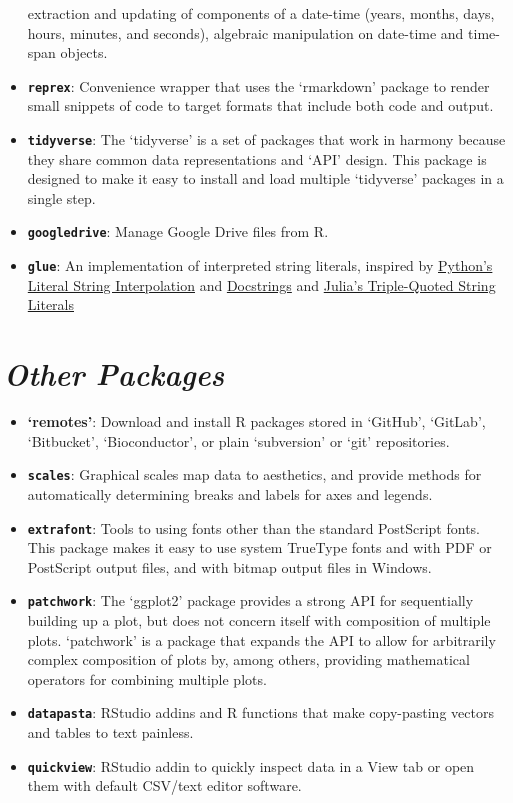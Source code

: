 \documentclass[
  letterpaper,
  DIV=11,
  numbers=noendperiod]{scrreprt}
\providecommand{\tightlist}{%
  \setlength{\itemsep}{0pt}\setlength{\parskip}{0pt}}\usepackage{longtable,booktabs,array}
\begin{document}
\begin{itemize}
  extraction and updating of components of a date-time (years, months,
  days, hours, minutes, and seconds), algebraic manipulation on
  date-time and time-span objects.
\item
  \textbf{\texttt{reprex}}: Convenience wrapper that uses the
  `rmarkdown' package to render small snippets of code to target formats
  that include both code and output.
\item
  \textbf{\texttt{tidyverse}}: The `tidyverse' is a set of packages that
  work in harmony because they share common data representations and
  `API' design. This package is designed to make it easy to install and
  load multiple `tidyverse' packages in a single step.
\item
  \textbf{\texttt{googledrive}}: Manage Google Drive files from R.
\item
  \textbf{\texttt{glue}}: An implementation of interpreted string
  literals, inspired by
  \href{https://www.python.org/dev/peps/pep-0498/}{Python's Literal
  String Interpolation} and
  \href{https://www.python.org/dev/peps/pep-0257/}{Docstrings} and
  \href{https://docs.julialang.org/en/v1.3/manual/strings/\#Triple-Quoted-String-Literals-1}{Julia's
  Triple-Quoted String Literals}
\end{itemize}

\hypertarget{other-packages}{%
\section{\texorpdfstring{\emph{Other
Packages}}{Other Packages}}\label{other-packages}}

\begin{itemize}
\tightlist
\item
  \textbf{`remotes'}: Download and install R packages stored in
  `GitHub', `GitLab', `Bitbucket', `Bioconductor', or plain `subversion'
  or `git' repositories.
\item
  \textbf{\texttt{scales}}: Graphical scales map data to aesthetics, and
  provide methods for automatically determining breaks and labels for
  axes and legends.
\item
  \textbf{\texttt{extrafont}}: Tools to using fonts other than the
  standard PostScript fonts. This package makes it easy to use system
  TrueType fonts and with PDF or PostScript output files, and with
  bitmap output files in Windows.
\item
  \textbf{\texttt{patchwork}}: The `ggplot2' package provides a strong
  API for sequentially building up a plot, but does not concern itself
  with composition of multiple plots. `patchwork' is a package that
  expands the API to allow for arbitrarily complex composition of plots
  by, among others, providing mathematical operators for combining
  multiple plots.
\item
  \textbf{\texttt{datapasta}}: RStudio addins and R functions that make
  copy-pasting vectors and tables to text painless.
\item
  \textbf{\texttt{quickview}}: RStudio addin to quickly inspect data in
  a View tab or open them with default CSV/text editor software.
\end{itemize}
\end{document}
